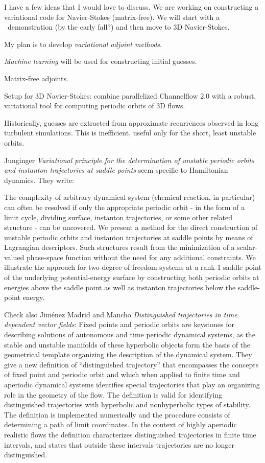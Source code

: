 \begin{description}
I have a few ideas that I would love to discuss. We are working on
constructing a variational code for Navier-Stokes (matrix-free). We will
start with a \KS\ demonstration (by the early fall?) and then move to 3D
Navier-Stokes.

My plan is to develop \emph{variational adjoint methods}.

\emph{Machine learning} will be used for constructing initial guesses.

Matrix-free adjoints.

Setup for 3D Navier-Stokes: combine parallelized Channelflow 2.0
with a robust, variational tool
for computing periodic orbits of 3D flows.

Historically, guesses are extracted from approximate recurrences observed
in long turbulent simulations. This is
inefficient, useful only for the short, least unstable orbits.

 {               \toCB
Junginger \etal{} {\em Variational principle for the determination
of unstable periodic orbits and instanton trajectories at saddle points} seem
specific to Hamiltonian dynamics. They write:

The complexity of arbitrary dynamical system  (chemical reaction, in
particular) can often be resolved if only the appropriate periodic orbit - in
the form of a limit cycle, dividing surface, instanton trajectories, or some
other related structure - can be uncovered. We present a method for the
direct construction of unstable periodic orbits and instanton trajectories at
saddle points by means of Lagrangian descriptors. Such structures result from
the minimization of a scalar-valued phase-space function without the need for
any additional constraints. We illustrate the approach for two-degree of
freedom systems at a rank-1 saddle point of the underlying potential-energy
surface by constructing both periodic orbits at energies above the saddle
point as well as instanton trajectories below the saddle-point energy.

Check also
Jim{\'e}nez Madrid and Mancho
{\em Distinguished trajectories in time dependent vector fields}:
Fixed points and periodic orbits are keystones for describing solutions of
autonomous and time periodic dynamical systems, as the stable and unstable
manifolds of these hyperbolic objects form the basis of the geometrical
template organizing the description of the dynamical system.
They give a new definition of ``distinguished trajectory'' that
encompasses the concepts of fixed point and periodic orbit and which when
applied to finite time and aperiodic dynamical systems identifies special
trajectories that play an organizing role in the geometry of the flow.
The definition is valid for identifying distinguished
trajectories with hyperbolic and nonhyperbolic types of stability. The
definition is implemented numerically and the procedure consists of
determining a path of limit coordinates. In the context of highly
aperiodic realistic flows the definition characterizes distinguished
trajectories in finite time intervals, and states that outside these
intervals trajectories are no longer distinguished.
}


\end{description}
